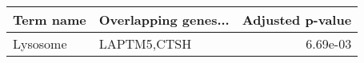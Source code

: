 \begin{tabular}{llr}
\toprule
Term name & Overlapping genes... &  Adjusted p-value \\
\midrule
 Lysosome &          LAPTM5,CTSH &          6.69e-03 \\
\bottomrule
\end{tabular}
